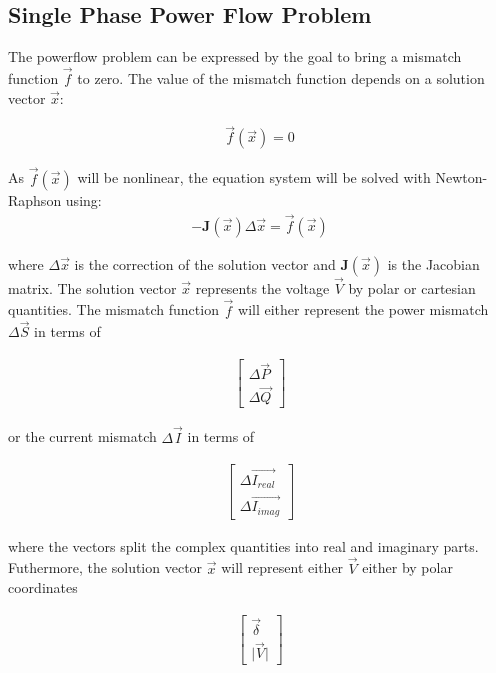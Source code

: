 \subsection{Single Phase Power Flow Problem}
The powerflow problem can be expressed by the goal to bring a mismatch function $\vec{f}$ to zero. The value of the mismatch function depends on a solution vector  $\vec{x}$:

\begin{align}
	\vec{f}(\vec{x}) = 0
	\label{equation:Target_equation}
 \end{align}


\noindent As $\vec{f} (\vec{x})$ will be nonlinear, the equation system will be solved with Newton-Raphson using:
\begin{align}
   - \textbf{J} (\vec{x}) \Delta \vec{x} = \vec{f} (\vec{x})
   \label{equation:NR_formula}
\end{align}

where $\Delta \vec{x}$ is the correction of the solution vector and $\textbf{J} (\vec{x})$ is the Jacobian matrix. The solution vector  $\vec{x}$ represents the voltage  $\vec{V}$ by polar or cartesian quantities. The mismatch function  $\vec{f}$ will either represent the power mismatch $\Delta \vec{S}$ in terms of  

\begin{align*}
	\left [ \begin{array}{c} \Delta \vec{P} \\ \Delta \vec{Q}  \end{array} \right ]
 \end{align*}

\noindent or the current mismatch $\Delta \vec{I}$ in terms of  

\begin{align*}
	\left [ \begin{array}{c} \Delta \vec{I_{real}} \\ \Delta \vec{I_{imag}}  \end{array} \right ]
\end{align*}

\noindent where the vectors split the complex quantities into real and imaginary parts. Futhermore, the solution vector $\vec{x}$ will represent either $\vec{V}$ either by polar coordinates 

\begin{align*}
	\left [ \begin{array}{c} \vec{\delta} \\ \vert \vec{V} \vert  \end{array} \right ]
\end{align*}

